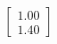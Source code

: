 \documentclass[preview]{standalone}
\begin{document}
\begin{align*}
\begin{bmatrix} 1.00 \\ 1.40 \end{bmatrix}
\end{align*}
\end{document}
